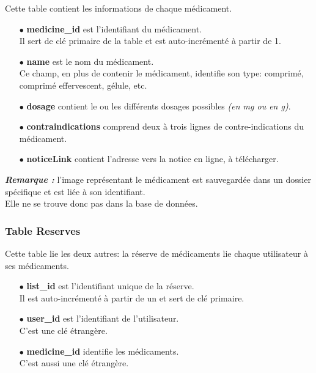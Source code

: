 Cette table contient les informations de chaque médicament.\\

\begin{itemize}
    
    \item[$\bullet$] \textbf{medicine\_id} est l'identifiant du médicament.\\
    Il sert de clé primaire de la table et est auto-incrémenté à partir de 1.
    
    \item[$\bullet$] \textbf{name} est le nom du médicament.\\
    Ce champ, en plus de contenir le médicament, identifie son type: comprimé, comprimé effervescent, gélule, etc.
    
    \item[$\bullet$] \textbf{dosage} contient le ou les différents dosages possibles \textit{(en mg ou en g)}.
    
    \item[$\bullet$] \textbf{contraindications} comprend deux à trois lignes de contre-indications du médicament.
    
    \item[$\bullet$] \textbf{noticeLink} contient l'adresse vers la notice en ligne, à télécharger.
    
\end{itemize}

\textbf{\textit{Remarque : }} l'image représentant le médicament est sauvegardée dans un dossier spécifique et est liée à son identifiant.\\
Elle ne se trouve donc pas dans la base de données.


\subsubsection{Table Reserves}
\label{sec:table-res}

Cette table lie les deux autres: la réserve de médicaments lie chaque utilisateur à ses médicaments.\\

\begin{itemize}

    \item[$\bullet$] \textbf{list\_id} est l'identifiant unique de la réserve.\\
    Il est auto-incrémenté à partir de un et sert de clé primaire.
    
    \item[$\bullet$] \textbf{user\_id} est l'identifiant de l'utilisateur.\\
    C'est une clé étrangère.
    
    \item[$\bullet$] \textbf{medicine\_id} identifie les médicaments.\\
    C'est aussi une clé étrangère.
    
\end{itemize}

